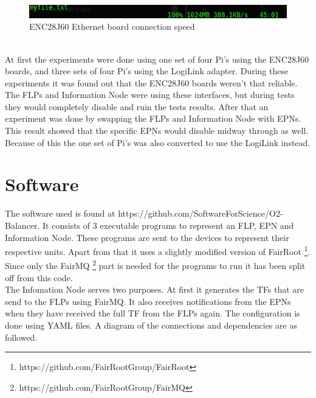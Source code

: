 \begin{figure}[htb]
	\includegraphics[width=\textwidth]{./graphics/gpio_ethernet_speed.jpg}
	\caption{ENC28J60 Ethernet board connection speed}
\end{figure}

~\\ At first the experiments were done using one set of four Pi's using the ENC28J60 boards, and three sets of four Pi's using the LogiLink adapter. During these experiments it was found out that the ENC28J60 boards weren't that reliable. The FLPs and Information Node were using these interfaces, but during tests they would completely disable and ruin the tests results. After that an experiment was done by swapping the FLPs and Information Node with EPNs. This result showed that the specific EPNs would disable midway through as well. Because of this the one set of Pi's was also converted to use the LogiLink instead.

\section{Software}
The software used is found at https://github.com/SoftwareForScience/O2-Balancer. It consists of 3 executable programs to represent an FLP, EPN and Information Node. These programs are sent to the devices to represent their respective units. Apart from that it uses a slightly modified version of FairRoot \footnote{https://github.com/FairRootGroup/FairRoot}. Since only the FairMQ \footnote{https://github.com/FairRootGroup/FairMQ} part is needed for the programs to run it has been split off from this code.\\
The Infomation Node serves two purposes. At first it generates the TFs that are send to the FLPs using FairMQ. It also receives notifications from the EPNs when they have received the full TF from the FLPs again. The configuration is done using YAML files. A diagram of the connections and dependencies are as followed.


